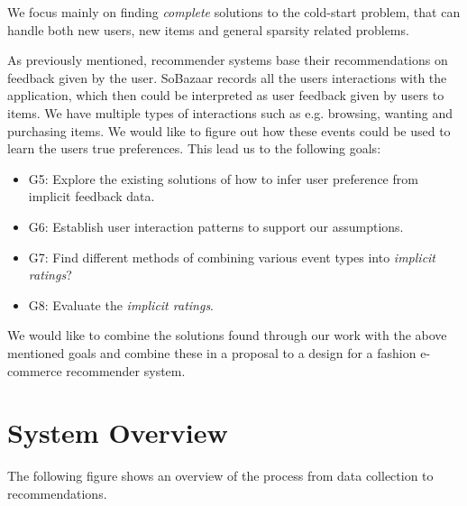 We focus mainly on finding \emph{complete} solutions to the cold-start problem, that can handle both new users, new items
and general sparsity related problems.

As previously mentioned, recommender systems base their recommendations on feedback given by the user. SoBazaar records
all the users interactions with the application, which then could be interpreted as user feedback given by users to items.
We have multiple types of interactions such as e.g. browsing, wanting and purchasing items. We would like to figure out
how these events could be used to learn the users true preferences. This lead us to the following goals:

\begin{itemize}
 	\item G5: Explore the existing solutions of how to infer user preference from implicit feedback data.
 	\item G6: Establish user interaction patterns to support our assumptions.
	\item G7: Find different methods of combining various event types into \emph{implicit ratings}?
  	\item G8: Evaluate the \emph{implicit ratings}.
\end{itemize}

We would like to combine the solutions found through our work with the above mentioned goals and combine these in a
proposal to a design for a fashion e-commerce recommender system.





\section{System Overview}

  
  
  The following figure shows an overview of the process from data collection to recommendations.
  
